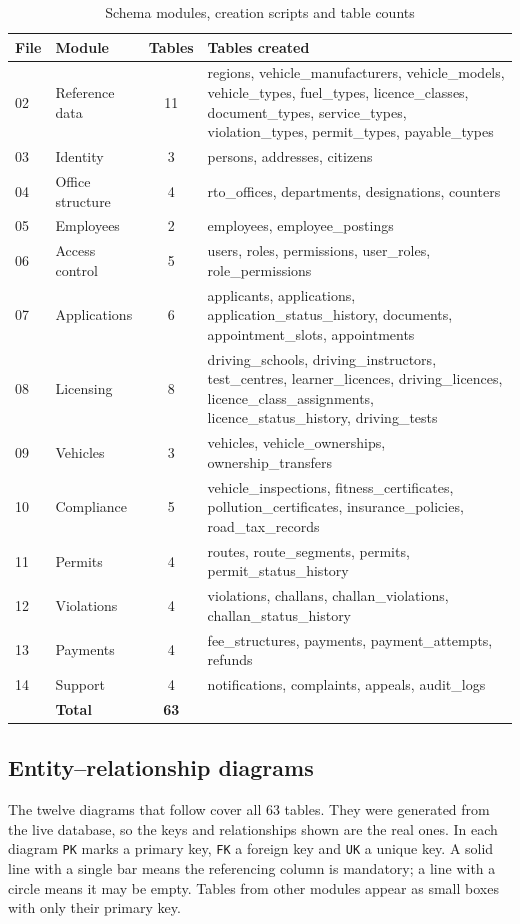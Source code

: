 \begin{table}[H]
\centering\small
\caption{Schema modules, creation scripts and table counts}\label{tab:dbmodules}
\begin{tabularx}{\linewidth}{@{}p{0.9cm}p{3.2cm}cX@{}}
\toprule \textbf{File} & \textbf{Module} & \textbf{Tables} & \textbf{Tables created}\\ \midrule
02 & Reference data & 11 & regions, vehicle\_manufacturers, vehicle\_models, vehicle\_types, fuel\_types, licence\_classes, document\_types, service\_types, violation\_types, permit\_types, payable\_types\\
03 & Identity & 3 & persons, addresses, citizens\\
04 & Office structure & 4 & rto\_offices, departments, designations, counters\\
05 & Employees & 2 & employees, employee\_postings\\
06 & Access control & 5 & users, roles, permissions, user\_roles, role\_permissions\\
07 & Applications & 6 & applicants, applications, application\_status\_history, documents, appointment\_slots, appointments\\
08 & Licensing & 8 & driving\_schools, driving\_instructors, test\_centres, learner\_licences, driving\_licences, licence\_class\_assignments, licence\_status\_history, driving\_tests\\
09 & Vehicles & 3 & vehicles, vehicle\_ownerships, ownership\_transfers\\
10 & Compliance & 5 & vehicle\_inspections, fitness\_certificates, pollution\_certificates, insurance\_policies, road\_tax\_records\\
11 & Permits & 4 & routes, route\_segments, permits, permit\_status\_history\\
12 & Violations & 4 & violations, challans, challan\_violations, challan\_status\_history\\
13 & Payments & 4 & fee\_structures, payments, payment\_attempts, refunds\\
14 & Support & 4 & notifications, complaints, appeals, audit\_logs\\
\midrule
 & \textbf{Total} & \textbf{63} & \\
\bottomrule
\end{tabularx}
\end{table}

\subsection{Entity--relationship diagrams}
The twelve diagrams that follow cover all 63 tables. They were generated from the live
database, so the keys and relationships shown are the real ones. In each diagram
\texttt{PK} marks a primary key, \texttt{FK} a foreign key and \texttt{UK} a unique key.
A solid line with a single bar means the referencing column is mandatory; a line with a
circle means it may be empty. Tables from other modules appear as small boxes with only
their primary key.


